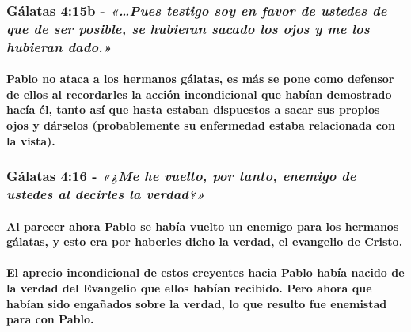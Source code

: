 \documentclass[11a pt,twoside]{article}
\newcommand{\scripture}[1]{%
  {\fontsize{12pt}{16pt}\selectfont\ScriptureFont\itshape #1}%
}
\let\oldsubsubsection\subsubsection
\renewcommand{\subsubsection}{\needspace{4\baselineskip}\oldsubsubsection}
\let\oldparagraph\paragraph
\renewcommand{\paragraph}{\needspace{3\baselineskip}\oldparagraph}
\begin{document}
\subsubsection{\texorpdfstring{Gálatas 4:15b -
\scripture{«…Pues testigo soy en favor de ustedes de que de ser posible, se hubieran sacado los ojos y me los hubieran dado.»}}{Gálatas 4:15b - }}\label{guxe1latas-415b---pues-testigo-soy-en-favor-de-ustedes-de-que-de-ser-posible-se-hubieran-sacado-los-ojos-y-me-los-hubieran-dado.}

\paragraph{Pablo no ataca a los hermanos gálatas, es más se pone como
defensor de ellos al recordarles la acción incondicional que habían
demostrado hacía él, tanto así que hasta estaban dispuestos a sacar sus
propios ojos y dárselos (probablemente su enfermedad estaba relacionada
con la
vista).}\label{pablo-no-ataca-a-los-hermanos-guxe1latas-es-muxe1s-se-pone-como-defensor-de-ellos-al-recordarles-la-acciuxf3n-incondicional-que-habuxedan-demostrado-hacuxeda-uxe9l-tanto-asuxed-que-hasta-estaban-dispuestos-a-sacar-sus-propios-ojos-y-duxe1rselos-probablemente-su-enfermedad-estaba-relacionada-con-la-vista.}

\subsubsection{\texorpdfstring{Gálatas 4:16
-\scripture{«¿Me he vuelto, por tanto, enemigo de ustedes al decirles la verdad?»}}{Gálatas 4:16 -}}\label{guxe1latas-416--me-he-vuelto-por-tanto-enemigo-de-ustedes-al-decirles-la-verdad}

\paragraph{Al parecer ahora Pablo se había vuelto un enemigo para los
hermanos gálatas, y esto era por haberles dicho la verdad, el evangelio
de
Cristo.}\label{al-parecer-ahora-pablo-se-habuxeda-vuelto-un-enemigo-para-los-hermanos-guxe1latas-y-esto-era-por-haberles-dicho-la-verdad-el-evangelio-de-cristo.}

\paragraph{El aprecio incondicional de estos creyentes hacia Pablo había
nacido de la verdad del Evangelio que ellos habían recibido. Pero ahora
que habían sido engañados sobre la verdad, lo que resulto fue enemistad
para con
Pablo.}\label{el-aprecio-incondicional-de-estos-creyentes-hacia-pablo-habuxeda-nacido-de-la-verdad-del-evangelio-que-ellos-habuxedan-recibido.-pero-ahora-que-habuxedan-sido-engauxf1ados-sobre-la-verdad-lo-que-resulto-fue-enemistad-para-con-pablo.}
\end{document}
